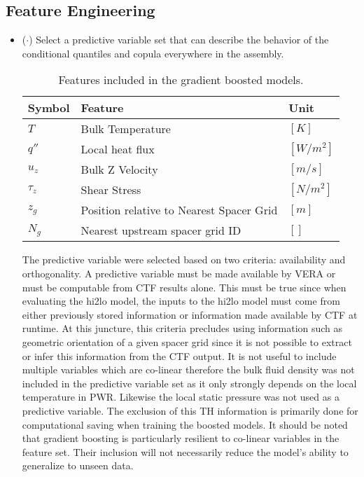 \subsection{Feature Engineering}
\begin{itemize}
	\item ($\cdot$) Select a predictive variable set that can describe the behavior of the conditional quantiles and copula everywhere in the assembly.
   
\begin{table}[h]
    \begin{center}
    \caption[Included features.]{Features included in the gradient boosted models.}
\begin{tabular}[h]{|l | l | l |}
    \hline
    Symbol & Feature & Unit \\
    \hline
    $T$ & Bulk Temperature  &  $[K]$ \\
    $q''$ & Local heat flux & $[W/m^2]$ \\
    $u_z$ & Bulk Z Velocity &  $[m/s]$ \\
    $\tau_z$ & Shear Stress &  $[N/m^2]$ \\
    $z_g$ & Position relative to Nearest Spacer Grid & $[m]$ \\
    $N_g$ & Nearest upstream spacer grid ID & $[]$ \\
    \hline
\end{tabular}
\end{center}
\end{table}

The predictive variable were selected based on two criteria:  availability and orthogonality.  A predictive variable must be made available by VERA or must be computable from CTF results alone.  This must be true since when evaluating the hi2lo model, the inputs to the hi2lo model must come from either previously stored information or information made available by CTF at runtime.  At this juncture, this criteria precludes using information such as geometric orientation of a given spacer grid since it is not possible to extract or infer this information from the CTF output.
It is not useful to include multiple variables which are co-linear therefore the bulk fluid density was not included in the predictive variable set as it only strongly depends on the local temperature in PWR. Likewise the local static pressure was not used as a predictive variable.  The exclusion of this TH information is primarily done for computational saving when training the boosted models.  It should be noted that gradient boosting is particularly resilient to co-linear variables in the feature set.  Their inclusion will not necessarily reduce the model's ability to generalize to unseen data.


\end{itemize}
